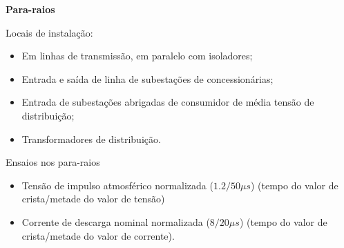 \textbf{Para-raios}

Locais de instalação:
\begin{itemize}
    \item Em linhas de transmissão, em paralelo com isoladores;
    \item Entrada e saída de linha de subestações de concessionárias;
    \item Entrada de subestações abrigadas de consumidor de média tensão de distribuição;
    \item Transformadores de distribuição.
\end{itemize}

Ensaios nos para-raios
\begin{itemize}
    \item Tensão de impulso atmosférico normalizada ($1.2/50 \mu s$) (tempo do valor de crista/metade do valor de tensão)
    \item Corrente de descarga nominal normalizada ($8/20 \mu s$) (tempo do valor de crista/metade do valor de corrente).
\end{itemize}

